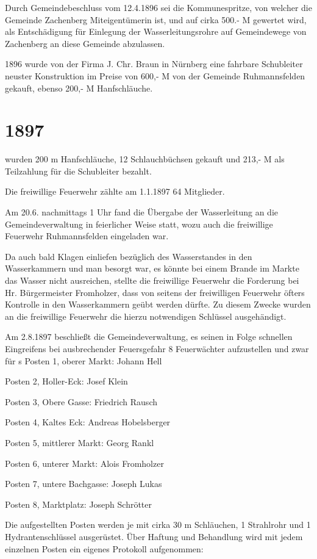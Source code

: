 \documentclass[12pt,a4paper]{book}
\begin{document}
Durch Gemeindebeschluss vom 12.4.1896 sei die Kommunespritze, von welcher die
Gemeinde Zachenberg Miteigentümerin ist, und auf cirka 500.- M gewertet wird,
als Entschädigung für Einlegung der Wasserleitungsrohre auf Gemeindewege von
Zachenberg an diese Gemeinde abzulassen.

1896 wurde von der Firma J. Chr. Braun in Nürnberg eine fahrbare Schubleiter
neuster Konstruktion im Preise von 600,- M von der Gemeinde Ruhmannsfelden
gekauft, ebenso 200,- M Hanfschläuche.

\section*{1897}

wurden 200 m Hanfschläuche, 12 Schlauchbüchsen gekauft und 213,- M als
Teilzahlung für die Schubleiter bezahlt.

Die freiwillige Feuerwehr zählte am 1.1.1897 64 Mitglieder.

Am 20.6. nachmittags 1 Uhr fand die Übergabe der Wasserleitung an die
Gemeindeverwaltung in feierlicher Weise statt, wozu auch die freiwillige
Feuerwehr Ruhmannsfelden eingeladen war.

Da auch bald Klagen einliefen bezüglich des Wasserstandes in den Wasserkammern
und man besorgt war, es könnte bei einem Brande im Markte das Wasser nicht
ausreichen, stellte die freiwillige Feuerwehr die Forderung bei Hr.
Bürgermeister Fromholzer, dass von seitens der freiwilligen Feuerwehr öfters
Kontrolle in den Wasserkammern geübt werden dürfte. Zu diesem Zwecke wurden an
die freiwillige Feuerwehr die hierzu notwendigen Schlüssel ausgehändigt.

Am 2.8.1897 beschließt die Gemeindeverwaltung, es seinen in Folge schnellen
Eingreifens bei ausbrechender Feuersgefahr 8 Feuerwächter aufzustellen und zwar
für
s
Posten 1, oberer Markt: Johann Hell

Posten 2, Holler-Eck: Josef Klein

Posten 3, Obere Gasse: Friedrich Rausch

Posten 4, Kaltes Eck: Andreas Hobelsberger

Posten 5, mittlerer Markt: Georg Rankl

Posten 6, unterer Markt: Alois Fromholzer

Posten 7, untere Bachgasse: Joseph Lukas

Posten 8, Marktplatz: Joseph Schrötter

Die aufgestellten Posten werden je mit cirka 30 m Schläuchen, 1 Strahlrohr und 1
Hydrantenschlüssel ausgerüstet. Über Haftung und Behandlung wird mit jedem
einzelnen Posten ein eigenes Protokoll aufgenommen:
\end{document}
